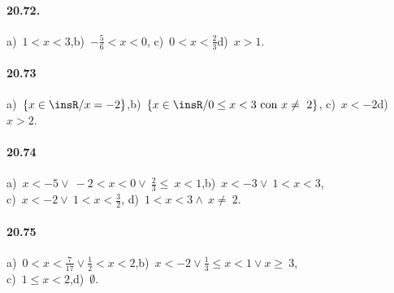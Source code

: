 \paragraph{20.72.} a)~$1<x<3$,\quad b)~$-\frac{5}{6}<x<0$,\quad
c)~$0<x<\frac{2}{3}$\quad d)~$x>1$. %

\paragraph{20.73} a)~$\left\{x\in\insR/x=-2\right\}$,\quad b)~$\left\{x\in \insR/0\le x<3\text{ con }x\neq~2\right\}$,\quad
c)~$x<-2$\quad d)~$x>2$.

\paragraph{20.74} a)~$x<-5\vee~-2<x<0\vee~\frac{2}{3}\le~x<1$,\quad b)~$x<-3\vee~1<x<3$, \protect\\
c)~$x<-2\vee~1<x<\frac{3}{2}$, \quad d)~$1<x<3\wedge~x\neq~2$.

\paragraph{20.75} a)~$0<x<\frac{7}{17}\vee\frac{1}{2}<x<2$,\quad b)~$x<-2\vee \frac{1}{3}\le x<1\vee x\ge~3$,
\protect\\ c)~$1\le x<2$,\quad d)~$\emptyset $.
